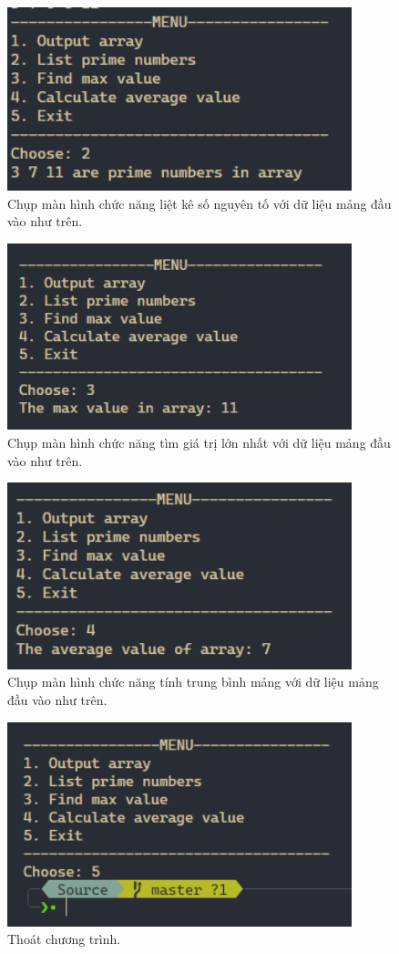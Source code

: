 \begin{figure}[H]
	\centering
	\includegraphics[width=10cm]{images/img5_2.PNG}
	\caption{Chụp màn hình chức năng liệt kê số nguyên tố với dữ liệu mảng đầu vào như trên.}
\end{figure}

\begin{figure}[H]
	\centering
	\includegraphics[width=10cm]{images/img5_3.PNG}
	\caption{Chụp màn hình chức năng tìm giá trị lớn nhất với dữ liệu mảng đầu vào như trên.}
\end{figure}

\begin{figure}[H]
	\centering
	\includegraphics[width=10cm]{images/img5_4.PNG}
	\caption{Chụp màn hình chức năng tính trung bình mảng với dữ liệu mảng đầu vào như trên.}
\end{figure}

\begin{figure}[H]
	\centering
	\includegraphics[width=10cm]{images/img5_5.PNG}
	\caption{Thoát chương trình.}
\end{figure}

